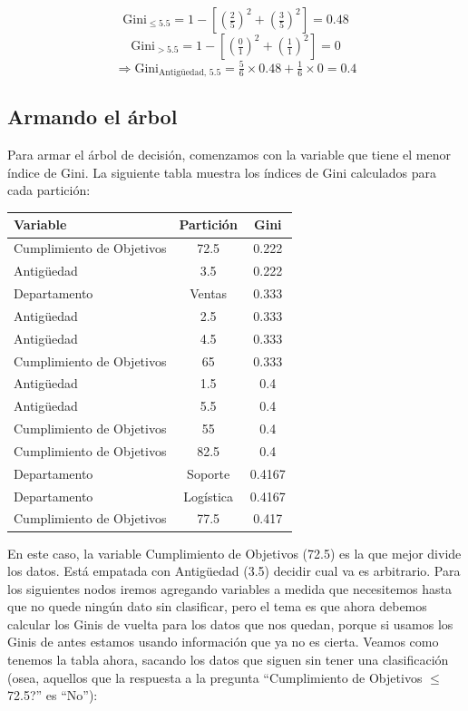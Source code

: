 \documentclass[12pt]{article}
\begin{document}
\[
  \mathrm{Gini}_{\le5.5} = 1 - \left[\left(\tfrac{2}{5}\right)^2 + \left(\tfrac{3}{5}\right)^2\right] = 0.48
\]
\[
  \mathrm{Gini}_{>5.5} = 1 - \left[\left(\tfrac{0}{1}\right)^2 + \left(\tfrac{1}{1}\right)^2\right] = 0
\]
\[
  \Rightarrow \mathrm{Gini}_{\text{Antigüedad, 5.5}} = \tfrac{5}{6}\times0.48 + \tfrac{1}{6}\times0 = 0.4
\]

\subsection{Armando el árbol}

Para armar el árbol de decisión, comenzamos con la variable que tiene el menor índice de Gini. La siguiente tabla muestra los índices de Gini calculados para cada partición:

\begin{table}[H]
  \centering
  \begin{tabular}{lcc}
    \toprule
    Variable & Partición & Gini \\
    \midrule
    Cumplimiento de Objetivos & 72.5 & 0.222 \\
    Antigüedad & 3.5 & 0.222 \\
    Departamento & Ventas & 0.333 \\
    Antigüedad & 2.5 & 0.333 \\
    Antigüedad & 4.5 & 0.333 \\
    Cumplimiento de Objetivos & 65 & 0.333 \\
    Antigüedad & 1.5 & 0.4 \\
    Antigüedad & 5.5 & 0.4 \\
    Cumplimiento de Objetivos & 55 & 0.4 \\
    Cumplimiento de Objetivos & 82.5 & 0.4 \\
    Departamento & Soporte & 0.4167 \\
    Departamento & Logística & 0.4167 \\
    Cumplimiento de Objetivos & 77.5 & 0.417 \\
    \bottomrule
  \end{tabular}
\end{table}

En este caso, la variable Cumplimiento de Objetivos (72.5) es la que mejor divide los datos. Está empatada con Antigüedad (3.5) decidir cual va es arbitrario. Para los siguientes nodos iremos agregando variables a medida que necesitemos hasta que no quede ningún dato sin clasificar, pero el tema es que ahora debemos calcular los Ginis de vuelta para los datos que nos quedan, porque si usamos los Ginis de antes estamos usando información que ya no es cierta. Veamos como tenemos la tabla ahora, sacando los datos que siguen sin tener una clasificación (osea, aquellos que la respuesta a la pregunta ``Cumplimiento de Objetivos $\leq$ 72.5?'' es ``No''):
\end{document}
